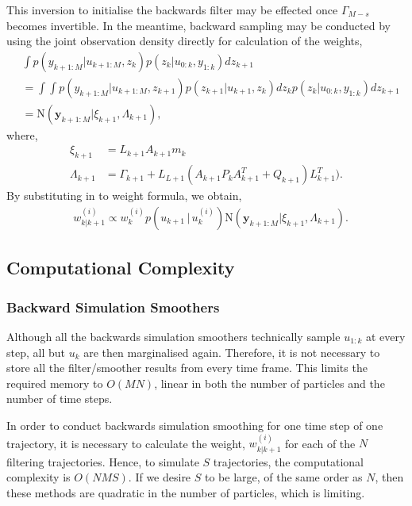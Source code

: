 \documentclass[twocolumn]{autart}    %
\begin{document}
This inversion to initialise the backwards filter may be effected once $\Gamma_{M-s}$ becomes invertible. In the meantime, backward sampling may be conducted by using the joint observation density directly for calculation of the weights,
%
\begin{equation}
\begin{split}
  &\int p(y_{k+1:M} | u_{k+1:M}, z_k) p(z_k | u_{0:k}, y_{1:k}) dz_{k+1} \\
  &= \int \int p(y_{k+1:M} | u_{k+1:M}, z_{k+1}) p(z_{k+1} | u_{k+1}, z_{k}) dz_k p(z_k | u_{0:k}, y_{1:k}) dz_{k+1} \\
  &= \mathrm{N}( \mathbf{y}_{k+1:M} | \xi_{k+1} , \Lambda_{k+1} )     ,
\end{split}
\end{equation}
%
where,
%
\begin{equation}
\begin{split}
  \xi_{k+1} &= L_{k+1} A_{k+1} m_k \\
  \Lambda_{k+1} &= \Gamma_{k+1} + L_{L+1} ( A_{k+1} P_k A_{k+1}^T + Q_{k+1} ) L_{k+1}^T )     .
\end{split}
\end{equation}
%
By substituting in to weight formula, we obtain,
%
\begin{equation}
\begin{split}
  &w_{k|k+1}^{(i)} \propto w^{(i)}_k p(u_{k+1}\,|\,u_{k}^{(i)}) \mathrm{N}( \mathbf{y}_{k+1:M} | \xi_{k+1} , \Lambda_{k+1} )     .
\end{split}
\end{equation}



\subsection{Computational Complexity}

\subsubsection{Backward Simulation Smoothers}

Although all the backwards simulation smoothers technically sample $u_{1:k}$ at every step, all but $u_k$ are then marginalised again. Therefore, it is not necessary to store all the filter/smoother results from every time frame. This limits the required memory to $O(MN)$, linear in both the number of particles and the number of time steps.

In order to conduct backwards simulation smoothing for one time step of one trajectory, it is necessary to calculate the weight, $w_{k|k+1}^{(i)}$ for each of the $N$ filtering trajectories. Hence, to simulate $S$ trajectories, the computational complexity is $O(NMS)$. If we desire $S$ to be large, of the same order as $N$, then these methods are quadratic in the number of particles, which is limiting.
\end{document}
